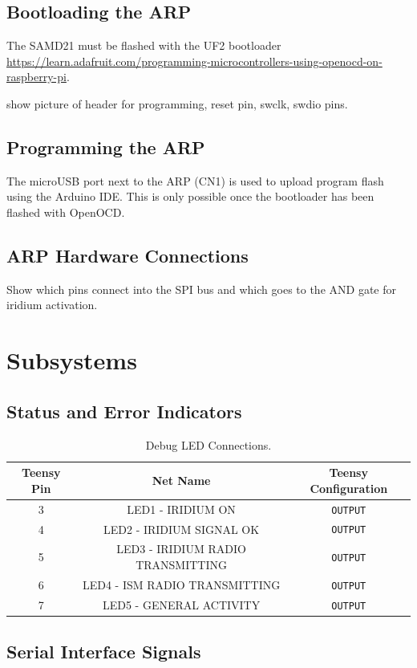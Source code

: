 \documentclass{article}
\begin{document}
\subsection{Bootloading the ARP}
The SAMD21 must be flashed with the UF2 bootloader \url{https://learn.adafruit.com/programming-microcontrollers-using-openocd-on-raspberry-pi}.

show picture of header for programming, reset pin, swclk, swdio pins. 
\subsection{Programming the ARP}
The microUSB port next to the ARP (CN1) is used to upload program flash using the Arduino IDE. This is only possible once the bootloader has been flashed with OpenOCD.

\subsection{ARP Hardware Connections}
Show which pins connect into the SPI bus and which goes to the AND gate for iridium activation.

\section{Subsystems}

\subsection{Status and Error Indicators}
\begin{table}[H]
    \centering
    \begin{tabular}{c|c|c}
    Teensy Pin & Net Name     & Teensy Configuration \\
    \hline 
    3 & LED1 - IRIDIUM ON        &   \texttt{OUTPUT}\\
    4 & LED2 - IRIDIUM SIGNAL OK       &   \texttt{OUTPUT}\\
    5 & LED3 - IRIDIUM RADIO TRANSMITTING       &   \texttt{OUTPUT}\\
    6 & LED4 - ISM RADIO TRANSMITTING       &   \texttt{OUTPUT}\\
    7 & LED5 - GENERAL ACTIVITY       &   \texttt{OUTPUT}
    \end{tabular}
    \caption{Debug LED Connections.}
    \label{tab:pins_leds}
\end{table}

\subsection{Serial Interface Signals}
\end{document}
